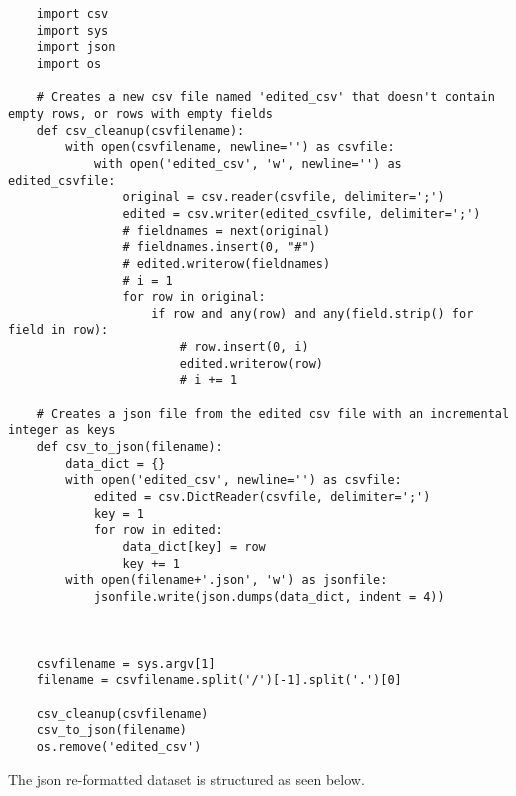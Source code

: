 \begin{verbatim}
    import csv
    import sys
    import json
    import os

    # Creates a new csv file named 'edited_csv' that doesn't contain empty rows, or rows with empty fields
    def csv_cleanup(csvfilename):
        with open(csvfilename, newline='') as csvfile:
            with open('edited_csv', 'w', newline='') as edited_csvfile:
                original = csv.reader(csvfile, delimiter=';')
                edited = csv.writer(edited_csvfile, delimiter=';')
                # fieldnames = next(original)
                # fieldnames.insert(0, "#")
                # edited.writerow(fieldnames)
                # i = 1
                for row in original:
                    if row and any(row) and any(field.strip() for field in row):
                        # row.insert(0, i)
                        edited.writerow(row)
                        # i += 1

    # Creates a json file from the edited csv file with an incremental integer as keys
    def csv_to_json(filename):
        data_dict = {}
        with open('edited_csv', newline='') as csvfile:
            edited = csv.DictReader(csvfile, delimiter=';')
            key = 1
            for row in edited: 
                data_dict[key] = row
                key += 1
        with open(filename+'.json', 'w') as jsonfile:
            jsonfile.write(json.dumps(data_dict, indent = 4))



    csvfilename = sys.argv[1]
    filename = csvfilename.split('/')[-1].split('.')[0]

    csv_cleanup(csvfilename)
    csv_to_json(filename)
    os.remove('edited_csv')
\end{verbatim}

The json re-formatted dataset is structured as seen below.

